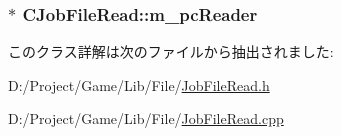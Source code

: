 \subsubsection[{m\+\_\+pc\+Reader}]{$\ast$ C\+Job\+File\+Read\+::m\+\_\+pc\+Reader\hspace{0.3cm}{\ttfamily [private]}}\label{class_c_job_file_read_a2951a4985790966c91eba8b22e26296a}


このクラス詳解は次のファイルから抽出されました\+:\begin{DoxyCompactItemize}
\item 
D\+:/\+Project/\+Game/\+Lib/\+File/\hyperlink{_job_file_read_8h}{Job\+File\+Read.\+h}\item 
D\+:/\+Project/\+Game/\+Lib/\+File/\hyperlink{_job_file_read_8cpp}{Job\+File\+Read.\+cpp}\end{DoxyCompactItemize}

